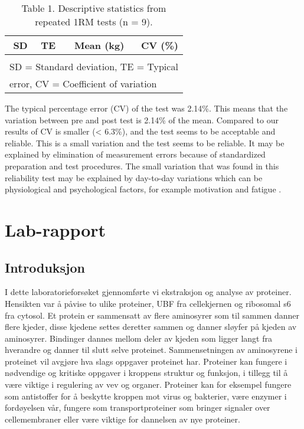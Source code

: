 \documentclass[
]{book}
\begin{document}
\begin{table}

\caption{\label{tab:unnamed-chunk-2}Table 1. Descriptive statistics from repeated 1RM tests (n = 9).}
\centering
\begin{tabular}[t]{r|r|r|r}
\hline
SD & TE & Mean (kg) & CV (\%)\\
\hline
\cellcolor{gray!6}{8.7} & \cellcolor{gray!6}{6.15} & \cellcolor{gray!6}{286.94} & \cellcolor{gray!6}{2.14}\\
\hline
\multicolumn{4}{l}{\textsuperscript{} SD = Standard deviation, TE = Typical}\\
\multicolumn{4}{l}{error, CV = Coefficient of variation}\\
\end{tabular}
\end{table}

The typical percentage error (CV) of the test was 2.14\%. This means that the variation between pre and post test is 2.14\% of the mean. Compared to \citet{schroeder2007} our results of CV is smaller (\textless{} 6.3\%), and the test seems to be acceptable and reliable. This is a small variation and the test seems to be reliable. It may be explained by elimination of measurement errors because of standardized preparation and test procedures. The small variation that was found in this reliability test may be explained by day-to-day variations which can be physiological and psychological factors, for example motivation and fatigue \citep{schroeder2007}.

\hypertarget{lab-rapport}{%
\chapter{Lab-rapport}\label{lab-rapport}}

\hypertarget{introduksjon}{%
\section{Introduksjon}\label{introduksjon}}

I dette laboratorieforsøket gjennomførte vi ekstraksjon og analyse av proteiner. Hensikten var å påvise to ulike proteiner, UBF fra cellekjernen og ribosomal s6 fra cytosol. Et protein er sammensatt av flere aminosyrer som til sammen danner flere kjeder, disse kjedene settes deretter sammen og danner sløyfer på kjeden av aminosyrer. Bindinger dannes mellom deler av kjeden som ligger langt fra hverandre og danner til slutt selve proteinet. Sammensetningen av aminosyrene i proteinet vil avgjøre hva slags oppgaver proteinet har. Proteiner kan fungere i nødvendige og kritiske oppgaver i kroppens struktur og funksjon, i tillegg til å være viktige i regulering av vev og organer. Proteiner kan for eksempel fungere som antistoffer for å beskytte kroppen mot virus og bakterier, være enzymer i fordøyelsen vår, fungere som transportproteiner som bringer signaler over cellemembraner \citep{alberts2015} eller være viktige for dannelsen av nye proteiner.
\end{document}
